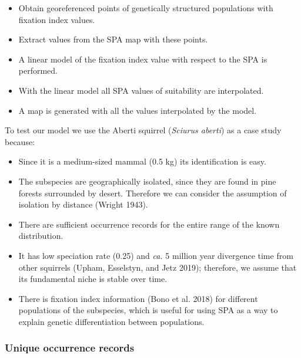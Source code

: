 \documentclass[
]{article}
\providecommand{\tightlist}{%
  \setlength{\itemsep}{0pt}\setlength{\parskip}{0pt}}
\begin{document}
\begin{itemize}
\tightlist
\item
  Obtain georeferenced points of genetically structured populations with
  fixation index values.
\item
  Extract values from the SPA map with these points.
\item
  A linear model of the fixation index value with respect to the SPA is
  performed.
\item
  With the linear model all SPA values of suitability are interpolated.
\item
  A map is generated with all the values interpolated by the model.
\end{itemize}

To test our model we use the Aberti squirrel (\emph{Sciurus aberti}) as
a case study because:

\begin{itemize}
\tightlist
\item
  Since it is a medium-sized mammal (0.5 kg) its identification is easy.
\item
  The subspecies are geographically isolated, since they are found in
  pine forests surrounded by desert. Therefore we can consider the
  assumption of isolation by distance (Wright 1943).
\item
  There are sufficient occurrence records for the entire range of the
  known distribution.
\item
  It has low speciation rate (0.25) and \textit{ca.} 5 million year divergence time from other squirrels (Upham, Esselstyn, and Jetz 2019); 
  therefore, we assume that its fundamental niche is stable over time.
\item
  There is fixation index information (Bono et al. 2018) for different
  populations of the subspecies, which is useful for using SPA as a way
  to explain genetic differentiation between populations.
\end{itemize}

\hypertarget{unique-occurrence-records}{%
\subsubsection{Unique occurrence
records}\label{unique-occurrence-records}}
\end{document}
